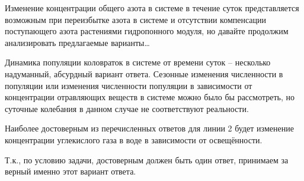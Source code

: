 Изменение концентрации общего азота в системе в течение суток представляется возможным при переизбытке азота в системе и отсутствии компенсации поступающего азота растениями гидропонного модуля, но давайте продолжим анализировать предлагаемые варианты…

Динамика популяции коловраток в системе от времени суток – несколько надуманный, абсурдный вариант ответа. Сезонные изменения численности в популяции или изменения численности популяции в зависимости от концентрации отравляющих веществ в системе можно было бы рассмотреть, но суточные колебания в данном случае не соответствуют реальности.

Наиболее достоверным из перечисленных ответов для линии 2 будет изменение концентрации углекислого газа в воде в зависимости от освещённости. 

Т.к., по условию задачи, достоверным должен быть один ответ, принимаем за верный именно этот вариант ответа.

